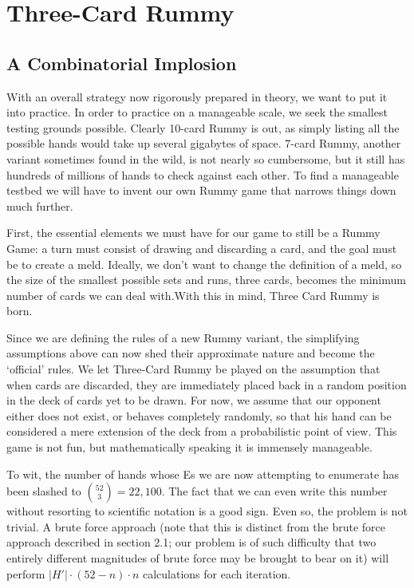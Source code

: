 \documentclass[letter,12pt]{article}
\begin{document}
\section{Three-Card Rummy}

\subsection{A Combinatorial Implosion}

With an overall strategy now rigorously prepared in theory, we want to put it into practice. In order to practice on a manageable scale, we seek the smallest testing grounds possible. Clearly 10-card Rummy is out, as simply listing all the possible hands would take up several gigabytes of space. 7-card Rummy, another variant sometimes found in the wild, is not nearly so cumbersome, but it still has hundreds of millions of hands to check against each other. To find a manageable testbed we will have to invent our own Rummy game that narrows things down much further.

First, the essential elements we must have for our game to still be a Rummy Game: a turn must consist of drawing and discarding a card, and the goal must be to create a meld. Ideally, we don’t want to change the definition of a meld, so the size of the smallest possible sets and runs, three cards, becomes the minimum number of cards we can deal with.With this in mind, Three Card Rummy is born. 

Since we are defining the rules of a new Rummy variant, the simplifying assumptions above can now shed their approximate nature and become the ‘official’ rules. We let Three-Card Rummy be played on the assumption that when cards are discarded, they are immediately placed back in a random position in the deck of cards yet to be drawn. For now, we assume that our opponent either does not exist, or behaves completely randomly, so that his hand can be considered a mere extension of the deck from a probabilistic point of view. This game is not fun, but mathematically speaking it is immensely manageable. 

To wit, the number of hands whose Es we are now attempting to enumerate has been slashed to $\binom{52}{3} = 22,100$. The fact that we can even write this number without resorting to scientific notation is a good sign. Even so, the problem is not trivial. A brute force approach (note that this is distinct from the brute force approach described in section 2.1; our problem is of such difficulty that two entirely different magnitudes of brute force may be brought to bear on it) will perform $|H′| \cdot(52−n ) \cdot n$ calculations for each iteration.
\end{document}

